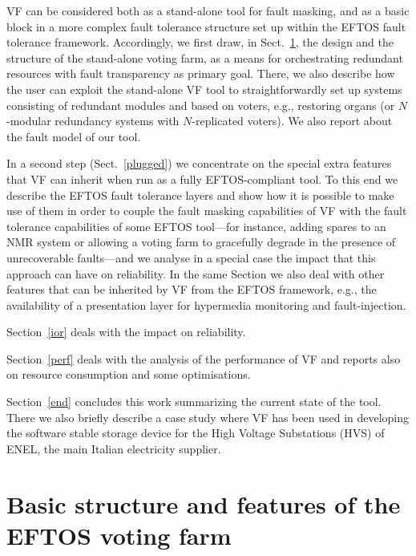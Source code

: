 \documentclass[11pt]{article}
\begin{document}
VF can be considered both as a stand-alone tool for fault masking, and
as a basic block in a more complex fault tolerance structure set up within
the EFTOS fault tolerance framework.  Accordingly, we first draw, in Sect.~\ref{standalone},
the design and the structure of the stand-alone voting farm, as a
means for orchestrating redundant resources with fault transparency as primary goal.
There, we also describe how the user can exploit the stand-alone VF tool to straightforwardly
set up systems consisting of redundant modules and based on voters, e.g.,
restoring organs (or $N\!$-modular redundancy systems with $N\!$-replicated voters).
We also report about the fault model of our tool.

In a second step (Sect.~\ref{plugged})
we concentrate on the special extra features that VF
can inherit when run as a fully EFTOS-compliant tool. To this end we 
describe the EFTOS fault tolerance layers and show how it is possible
to make use of them in order to couple the fault masking capabilities
of VF with the fault tolerance capabilities of some EFTOS tool---for instance,
adding spares to an NMR
system or allowing a voting farm to gracefully degrade in the presence
of unrecoverable faults---and we analyse in a special case the impact that
this approach can have on reliability. In the same Section we also deal with other
features that can be inherited by VF from the EFTOS framework, e.g.,
the availability of a presentation layer for hypermedia monitoring
and fault-injection.

Section~\ref{ior} deals with the impact on reliability.

Section~\ref{perf} deals with the analysis of the performance of VF
and reports also on resource consumption and some optimisations.

Section~\ref{end} concludes this work summarizing the current state of the tool. There we also
briefly describe a case study where
VF has been used in developing the software stable storage
device for the High Voltage Substations (HVS) of ENEL, the
main Italian electricity supplier.


\section{Basic structure and features of the EFTOS voting farm}\label{standalone}
\end{document}
